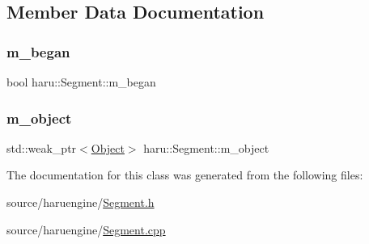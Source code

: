 \subsection{Member Data Documentation}
\mbox{\label{classharu_1_1_segment_a57c2851dcf8880898a1175b3fe25bae7}} 
\subsubsection{\texorpdfstring{m\+\_\+began}{m\_began}}
{\footnotesize\ttfamily bool haru\+::\+Segment\+::m\+\_\+began\hspace{0.3cm}{\ttfamily [private]}}

\mbox{\label{classharu_1_1_segment_af7740dcdd156244b9b1ac2cba85b6120}} 
\subsubsection{\texorpdfstring{m\+\_\+object}{m\_object}}
{\footnotesize\ttfamily std\+::weak\+\_\+ptr$<$\mbox{\hyperlink{classharu_1_1_object}{Object}}$>$ haru\+::\+Segment\+::m\+\_\+object\hspace{0.3cm}{\ttfamily [private]}}



The documentation for this class was generated from the following files\+:\begin{DoxyCompactItemize}
\item 
source/haruengine/\mbox{\hyperlink{_segment_8h}{Segment.\+h}}\item 
source/haruengine/\mbox{\hyperlink{_segment_8cpp}{Segment.\+cpp}}\end{DoxyCompactItemize}
